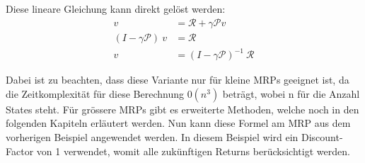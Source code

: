 Diese lineare Gleichung kann direkt gelöst werden:
\begin{align}
 v&=\mathcal{R}+\gamma\mathcal{P}v \nonumber\\
\left(I-\gamma\mathcal{P}\right)\ v&=\mathcal{R} \nonumber\\
v&=\left(I-\gamma\mathcal{P}\right)^{-1}\ \mathcal{R} \label{solve-lin-equa}
\end{align}


Dabei ist zu beachten, dass diese Variante nur für kleine MRPs geeignet ist, da die Zeitkomplexität für diese Berechnung $0(n^3)$ beträgt, wobei n für die Anzahl States steht. Für grössere MRPs gibt es erweiterte Methoden, welche noch in den folgenden Kapiteln erläutert werden. Nun kann diese Formel am MRP aus dem vorherigen Beispiel angewendet werden. In diesem Beispiel wird ein Discount-Factor von 1 verwendet, womit alle zukünftigen Returns berücksichtigt werden.

